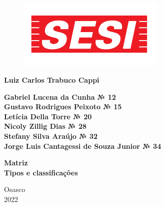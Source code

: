 \documentclass[a4paper,12pt]{article}
\begin{document}

\thispagestyle{empty}
\begin{center}

    
    \begin{figure}[h]
    
    \centering %
    \includegraphics[width=7cm]{figuras/sesi-logo.png} %

    \end{figure}
    
    \Large \textbf{Luiz Carlos Trabuco Cappi}
    \Large \textbf{}
    
    \vspace{2 cm}
    \Large \textbf{Gabriel Lucena da Cunha № 12 \\ Gustavo Rodrigues Peixoto № 15 \\ Letícia Della Torre № 20 \\ Nicoly Zillig Dias № 28 \\ Stefany Silva Araújo № 32 \\ Jorge Luis Cantagessi de Souza Junior № 34}
    
    
    \vspace{2 cm}   
    \Large \textbf{Matriz} \\
    \textbf{Tipos e classificações}
    
\end{center}

\begin{center}
    \vspace{6.2 cm}
    Osasco\\
    2022
\end{center}


\newpage
\end{document}
